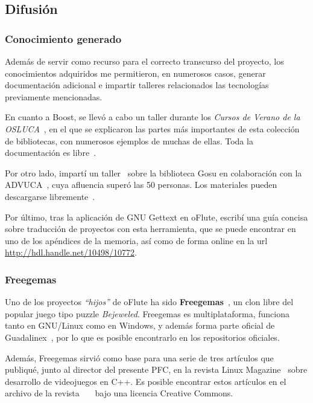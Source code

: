 \documentclass[a4paper,11pt]{article}
\begin{document}
\subsection{Difusión}

\subsubsection{Conocimiento generado}

Además de servir como recurso para el correcto transcurso del proyecto, los
conocimientos adquiridos me permitieron, en numerosos casos, generar
documentación adicional e impartir talleres relacionados las tecnologías
previamente mencionadas.

En cuanto a Boost, se llevó a cabo un taller durante los \textit{Cursos de
  Verano de la OSLUCA}~\cite{cursosverano}, en el que se explicaron las partes
más importantes de esta colección de bibliotecas, con numerosos ejemplos de
muchas de ellas. Toda la documentación es libre~\cite{materialesCursoBoost}.

Por otro lado, impartí un taller~\cite{tallergosu} sobre la biblioteca Gosu en
colaboración con la ADVUCA~\cite{advuca}, cuya afluencia superó las 50
personas. Los materiales pueden descargarse
libremente~\cite{tallergosumateriales}.

Por último, tras la aplicación de GNU Gettext en oFlute, escribí una guía
concisa sobre traducción de proyectos con esta herramienta, que se puede
encontrar en uno de los apéndices de la memoria, así como de forma online en la
url \url{http://hdl.handle.net/10498/10772}.


\subsubsection{Freegemas}

Uno de los proyectos \textit{``hijos''} de oFlute ha sido
\textbf{Freegemas}~\cite{freegemas}, un clon libre del popular juego tipo puzzle
\textit{Bejeweled}. Freegemas es multiplataforma, funciona tanto en GNU/Linux
como en Windows, y además forma parte oficial de Guadalinex~\cite{guadalinex},
por lo que es posible encontrarlo en los repositorios oficiales.

Además, Freegemas sirvió como base para una serie de tres artículos que
publiqué, junto al director del presente PFC, en la revista Linux
Magazine~\cite{linuxmagazine} sobre desarrollo de videojuegos en C++. Es posible
encontrar estos artículos en el archivo de la
revista~\cite{refarticulo1}~\cite{refarticulo2}~\cite{refarticulo3} bajo una
licencia Creative Commons.
\end{document}
